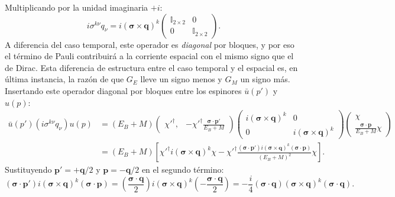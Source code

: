 \documentclass[10pt,a4paper]{article}
\begin{document}
Multiplicando por la unidad imaginaria $+i$:
\begin{equation}
i \sigma^{k\nu} q_\nu = i (\boldsymbol{\sigma} \times \mathbf{q})^k \begin{pmatrix} \mathbb{I}_{2\times 2} & 0 \\ 0 & \mathbb{I}_{2\times 2} \end{pmatrix}.
\end{equation}
A diferencia del caso temporal, este operador es \emph{diagonal} por bloques, y por eso el término de Pauli contribuirá a la corriente espacial con el mismo signo que el de Dirac. Esta diferencia de estructura entre el caso temporal y el espacial es, en última instancia, la razón de que $G_E$ lleve un signo menos y $G_M$ un signo más. Insertando este operador diagonal por bloques entre los espinores $\bar{u}(p')$ y $u(p)$:
\begin{align}
\bar{u}(p') (i \sigma^{k\nu} q_\nu) u(p) &= (E_B + M) \begin{pmatrix} \chi'^\dagger, & -\chi'^\dagger \frac{\boldsymbol{\sigma} \cdot \mathbf{p}'}{E_B + M} \end{pmatrix} \begin{pmatrix} i(\boldsymbol{\sigma} \times \mathbf{q})^k & 0 \\ 0 & i(\boldsymbol{\sigma} \times \mathbf{q})^k \end{pmatrix} \begin{pmatrix} \chi \\ \frac{\boldsymbol{\sigma} \cdot \mathbf{p}}{E_B + M} \chi \end{pmatrix} \nonumber \\
&= (E_B + M) \left[ \chi'^\dagger i(\boldsymbol{\sigma} \times \mathbf{q})^k \chi - \chi'^\dagger \frac{(\boldsymbol{\sigma} \cdot \mathbf{p}') i(\boldsymbol{\sigma} \times \mathbf{q})^k (\boldsymbol{\sigma} \cdot \mathbf{p})}{(E_B + M)^2} \chi \right].
\end{align}
Sustituyendo $\mathbf{p}' = +\mathbf{q}/2$ y $\mathbf{p} = -\mathbf{q}/2$ en el segundo término:
\begin{equation}
(\boldsymbol{\sigma} \cdot \mathbf{p}') i(\boldsymbol{\sigma} \times \mathbf{q})^k (\boldsymbol{\sigma} \cdot \mathbf{p}) = \left( \frac{\boldsymbol{\sigma} \cdot \mathbf{q}}{2} \right) i(\boldsymbol{\sigma} \times \mathbf{q})^k \left( -\frac{\boldsymbol{\sigma} \cdot \mathbf{q}}{2} \right) = - \frac{i}{4} (\boldsymbol{\sigma} \cdot \mathbf{q}) (\boldsymbol{\sigma} \times \mathbf{q})^k (\boldsymbol{\sigma} \cdot \mathbf{q}).
\end{equation}
\end{document}
